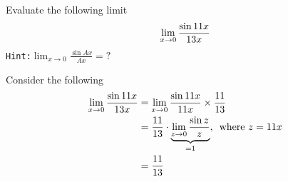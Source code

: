 



\question[4] Evaluate the following limit \[ \lim_{x\to 0}\dfrac{\sin11 x}{13 x}\]
\texttt{Hint:}$\lim_{x\to 0}\frac{\sin Ax}{Ax} = ?$

\watchout[-40pt]

\begin{solution}[\mcq]
  Consider the following
  \begin{align}
    \lim_{x\to 0}\dfrac{\sin11 x}{13 x} &= \lim_{x\to 0}\dfrac{\sin11 x}{11 x}\times\dfrac{11}{13} \\
    &= \dfrac{11}{13}\cdot
    \underbrace{\lim_{z\to 0}\dfrac{\sin z}{z}}_{=1},\,\text{ where } z = 11 x \\
    &= \dfrac{11}{13}
  \end{align}
\end{solution}

